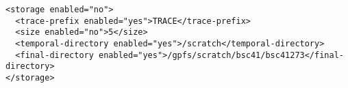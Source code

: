 \begin{verbatim}
<storage enabled="no">
  <trace-prefix enabled="yes">TRACE</trace-prefix>
  <size enabled="no">5</size>
  <temporal-directory enabled="yes">/scratch</temporal-directory>
  <final-directory enabled="yes">/gpfs/scratch/bsc41/bsc41273</final-directory>
</storage>
\end{verbatim}
